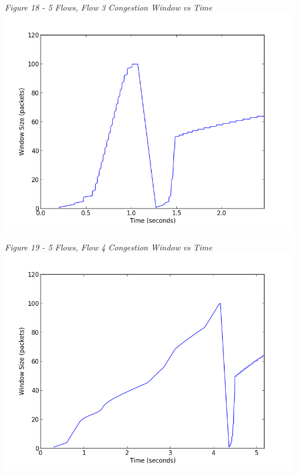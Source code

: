\documentclass[11pt]{article}
\begin{document}
\textit{Figure 18 - 5 Flows, Flow 3 Congestion Window vs Time}
\\
\includegraphics[width=13cm]{5_data/5_3-window}
\vspace{0.25cm}

\textit{Figure 19 - 5 Flows, Flow 4 Congestion Window vs Time}
\\
\includegraphics[width=13cm]{5_data/5_4-window}
\vspace{0.25cm}
\end{document}
